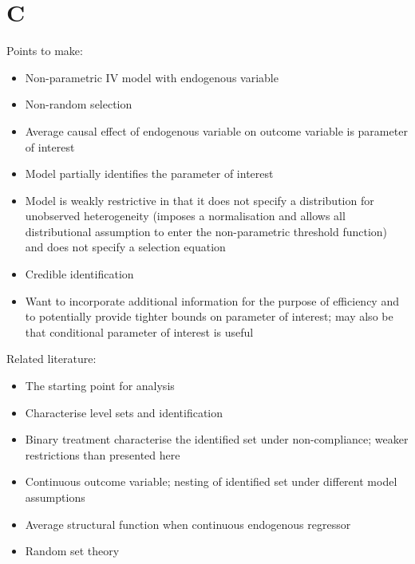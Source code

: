 \documentclass[10pt,a4paper,twoside]{article}
\numberwithin{equation}{subsection}
\begin{document}
\section{C}
Points to make:
\begin{itemize}
\item Non-parametric IV model with endogenous variable
\item Non-random selection
\item Average causal effect of endogenous variable on outcome variable is parameter of interest
\item Model partially identifies the parameter of interest
\item Model is weakly restrictive in that it does not specify a distribution for unobserved heterogeneity (imposes a normalisation and allows all distributional assumption to enter the non-parametric threshold function) and does not specify a selection equation
\item Credible identification
\item Want to incorporate additional information for the purpose of efficiency and to potentially provide tighter bounds on parameter of interest; may also be that conditional parameter of interest is useful
\end{itemize}
Related literature:
\begin{itemize}
\item \cite{cr13} The starting point for analysis
\item \cite{crs13} Characterise level sets and identification
\item \cite{bp97} Binary treatment characterise the identified set under non-compliance; weaker restrictions than presented here
\item \cite{kI09} Continuous outcome variable; nesting of identified set under different model assumptions
\item \cite{bLpO03} Average structural function when continuous endogenous regressor
\item \cite{bEmOImOF12} Random set theory
\end{itemize}
\end{document}
